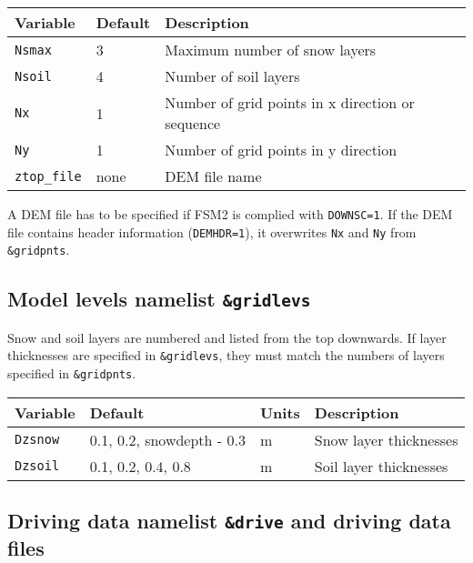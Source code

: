 \documentclass{article}
\begin{document}
\begin{tabular}{|l|l|l|}
\hline
Variable & Default & Description \\
\hline
{\tt Nsmax}      & 3    & Maximum number of snow layers                    \\
{\tt Nsoil}      & 4    & Number of soil layers                            \\
{\tt Nx}         & 1    & Number of grid points in x direction or sequence \\
{\tt Ny}         & 1    & Number of grid points in y direction             \\
{\tt ztop\_file} & none & DEM file name                                    \\
\hline
\end{tabular}

A DEM file has to be specified if FSM2 is complied with {\tt DOWNSC=1}. If the DEM file contains header information ({\tt DEMHDR=1}), it overwrites {\tt Nx} and {\tt Ny} from {\tt \&gridpnts}.

\subsection*{Model levels namelist {\tt \&gridlevs}}
Snow and soil layers are numbered and listed from the top downwards. If layer thicknesses are specified in {\tt \&gridlevs}, they must match the numbers of layers specified in {\tt \&gridpnts}.

\begin{tabular}{|l|l|l|l|}
\hline
Variable & Default & Units & Description \\
\hline
{\tt Dzsnow} & 0.1, 0.2, snowdepth - 0.3 & m & Snow layer thicknesses \\
{\tt Dzsoil} & 0.1, 0.2, 0.4, 0.8        & m & Soil layer thicknesses \\
\hline
\end{tabular}

\subsection*{Driving data namelist {\tt \&drive} and driving data files}
\end{document}
